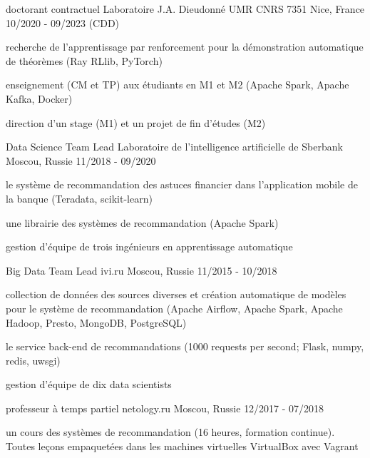\begin{cventries}
  \cventry
    {doctorant contractuel}
    {Laboratoire J.A. Dieudonné UMR CNRS 7351}
    {Nice, France}
    {10/2020 - 09/2023 (CDD)}
    {
      \begin{cvitems}
        \item {recherche de l'apprentissage par renforcement pour la démonstration automatique de théorèmes (Ray RLlib, PyTorch)}
        \item {enseignement (CM et TP) aux étudiants en M1 et M2 (Apache Spark, Apache Kafka, Docker)}
        \item {direction d'un stage (M1) et un projet de fin d'études (M2)}
      \end{cvitems}
    }
  \cventry
    {Data Science Team Lead}
    {Laboratoire de l'intelligence artificielle de Sberbank}
    {Moscou, Russie}
    {11/2018 - 09/2020}
    {
      \begin{cvitems}
        \item {le système de recommandation des astuces financier dans l'application mobile de la banque (Teradata, scikit-learn)}
        \item {une librairie des systèmes de recommandation (Apache Spark)}
        \item {gestion d'équipe de trois ingénieurs en apprentissage automatique}
      \end{cvitems}
    }
  \cventry
    {Big Data Team Lead}
    {ivi.ru}
    {Moscou, Russie}
    {11/2015 - 10/2018}
    {
      \begin{cvitems}
        \item {collection de données des sources diverses et création automatique de modèles pour le système de recommandation (Apache Airflow, Apache Spark, Apache Hadoop, Presto, MongoDB, PostgreSQL)}
        \item {le service back-end de recommandations (1000 requests per second; Flask, numpy, redis, uwsgi)}
        \item {gestion d'équipe de dix data scientists}
      \end{cvitems}
    }
  \cventry
    {professeur à temps partiel}
    {netology.ru}
    {Moscou, Russie}
    {12/2017 - 07/2018}
    {
      \begin{cvitems}
        \item {un cours des systèmes de recommandation (16 heures, formation continue). Toutes leçons empaquetées dans les machines virtuelles VirtualBox avec Vagrant}
      \end{cvitems}
}
\end{cventries}
